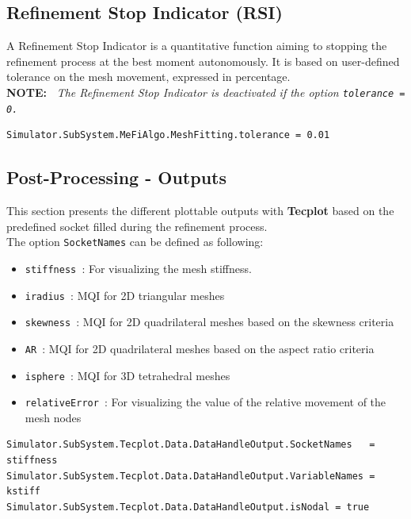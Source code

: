 \documentclass[11pt]{article}
\begin{document}
\subsection{Refinement Stop Indicator (RSI)}
A Refinement Stop Indicator is a quantitative function aiming to stopping the refinement process at the best moment autonomously. It is based on user-defined tolerance on the mesh movement, expressed in percentage.\\
{\bf NOTE:~} {\it The  Refinement Stop Indicator is deactivated if the option {\tt tolerance = 0.}}
\begin{verbatim}
Simulator.SubSystem.MeFiAlgo.MeshFitting.tolerance = 0.01
\end{verbatim}

\subsection{Post-Processing - Outputs}
This section presents the different plottable outputs with \textbf{Tecplot} based on the predefined socket filled during the refinement process.\\
The option {\tt SocketNames} can be defined as following:
\begin{itemize}
\item {\tt stiffness }: For visualizing the mesh stiffness.
\item {\tt iradius   }: MQI for 2D triangular meshes
\item {\tt skewness  }: MQI for 2D quadrilateral meshes based on the skewness criteria 
\item {\tt AR        }: MQI for 2D quadrilateral meshes based on the aspect ratio criteria
\item {\tt isphere  }:  MQI for 3D tetrahedral meshes
\item {\tt relativeError }: For visualizing the value of the relative movement of the mesh nodes 
\end{itemize}

\begin{verbatim}
Simulator.SubSystem.Tecplot.Data.DataHandleOutput.SocketNames   = stiffness
Simulator.SubSystem.Tecplot.Data.DataHandleOutput.VariableNames = kstiff
Simulator.SubSystem.Tecplot.Data.DataHandleOutput.isNodal = true
\end{verbatim}
\end{document}
